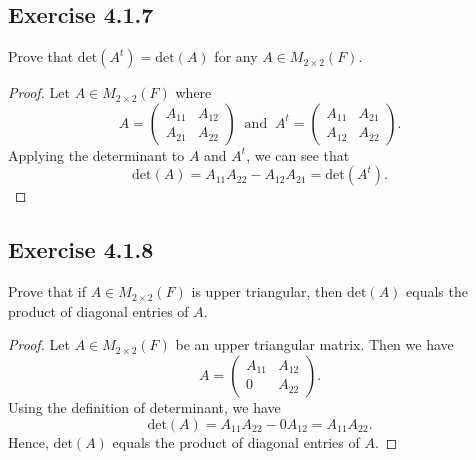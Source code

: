 \subsection*{Exercise 4.1.7} Prove that \( \text{det}(A^{t}) = \text{det}(A) \) for any \( A \in {M}_{2 \times 2}(F)  \).
\begin{proof}
Let \( A \in {M}_{2 \times 2} (F) \) where 
\[  A = \begin{pmatrix}
    {A}_{11} & {A}_{12} \\
    {A}_{21} & {A}_{22}
\end{pmatrix} \ \text{ and } \ A^{t} = \begin{pmatrix}
    {A}_{11} & {A}_{21} \\
    {A}_{12} & {A}_{22}
\end{pmatrix}. \]
Applying the determinant to \( A  \) and \( A^{t} \), we can see that
\[  \text{det}(A) = {A}_{11} {A}_{22} - {A}_{12} {A}_{21} = \text{det}(A^{t}). \]
\end{proof}

\subsection*{Exercise 4.1.8} Prove that if \( A \in {M}_{2 \times 2}(F) \) is upper triangular, then \( \text{det}(A) \) equals the product of diagonal entries of \( A  \).
\begin{proof}
Let \( A \in {M}_{2 \times 2}(F)  \) be an upper triangular matrix. Then we have
\[  A = \begin{pmatrix}
    {A}_{11} & {A}_{12} \\
    0 & {A}_{22}
\end{pmatrix}. \]
Using the definition of determinant, we have 
\[  \text{det}(A) = {A}_{11}{A}_{22} - 0 {A}_{12} = {A}_{11} {A}_{22}. \]
Hence, \( \text{det}(A)  \) equals the product of diagonal entries of \( A  \).
\end{proof}

